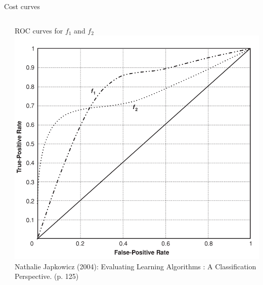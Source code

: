 \documentclass[11pt,compress,t,notes=noshow, xcolor=table]{beamer}
\begin{document}
\begin{vbframe}{Cost curves}
\begin{columns}
\begin{column}{0.6\textwidth}
\end{column}
\begin{column}{0.39\textwidth}
    \centering
    \tiny ROC curves for $f_1$ and $f_2$
    \includegraphics[width=\textwidth]{figure_man/cost-curves-1.png}
    {\tiny Nathalie Japkowicz (2004): Evaluating Learning Algorithms : A
    Classification Perspective. (p. 125)}
\end{column}
\end{columns}


\end{vbframe}



\end{document}

